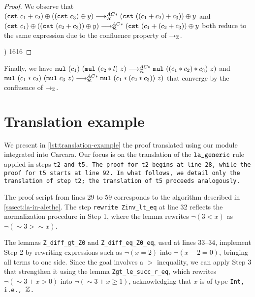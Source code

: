 \begin{proof}
We observe that $\cst{c_1 + c_2} \oplus (\cst{c_3} \oplus y) \MRAC \add{\cst{((c_1 + c_2) + c_3)}}{y}$
and $\cst{c_1} \oplus (\cst{(c_2 + c_3)} \oplus y) \MRAC \add{\cst{(c_1 + (c_2 + c_3)}}{y}$
both reduce to the same expression due to the confluence property of $\ra_\bb{Z}$.

\cp
{  } 
{  }
{ )} 
{16}{16}
\end{proof}

Finally, we have $\mul{(c_1)}{(\mul{(c_2 * l)}{z})} \MRAC \mul{((c_1 * c_2) * c_3)}{z})$
and $\mul{(c_1 * c_2)}{(\mul{c_3}{z}}) \MRAC \mul{(c_1 * (c_2 * c_3))}{z})$ that converge by the confluence of $\ra_\bb{Z}$.

\section{Translation example}
\label{app:example-translation}

We present in \cref{lst:translation-example} the proof translated using our module integrated into Carcara.
Our focus is on the translation of the $\tt{la\_generic}$ rule applied in steps \tt{t2} and \tt{t5}.
The proof for \tt{t2} begins at line 28, while the proof for \tt{t5} starts at line 92.
In what follows, we detail only the translation of step \tt{t2}; the translation of \tt{t5} proceeds analogously.

The proof script from lines 29 to 59 corresponds to the algorithm described in \cref{sssect:la-in-alethe}.
The step \lstinline[language=Lambdapi,basicstyle=\ttfamily\footnotesize\upshape]|rewrite Zinv_lt_eq| at line 32 reflects the normalization procedure in Step 1, where the lemma rewrites $\neg (3 < x)$ as $\neg (\sim 3 > \sim x)$.

The lemmas \lstinline[language=Lambdapi,basicstyle=\ttfamily\footnotesize\upshape]|Z_diff_gt_Z0| and \lstinline[language=Lambdapi,basicstyle=\ttfamily\footnotesize\upshape]|Z_diff_eq_Z0_eq|,
used at lines 33–34, implement Step 2 by rewriting expressions such as $\neg (x = 2)$ into $\neg (x - 2 = 0)$, bringing all terms to one side.
Since the goal involves a $>$ inequality, we can apply Step 3 that strengthen it using the lemma \lstinline[language=Lambdapi,basicstyle=\ttfamily\footnotesize\upshape]|Zgt_le_succ_r_eq|,
which rewrites $\neg (\sim 3 + x > 0)$ into $\neg (\sim 3 + x \geq 1)$, acknowledging that $x$ is of type \tt{Int}, i.e., $\bb{Z}$.

